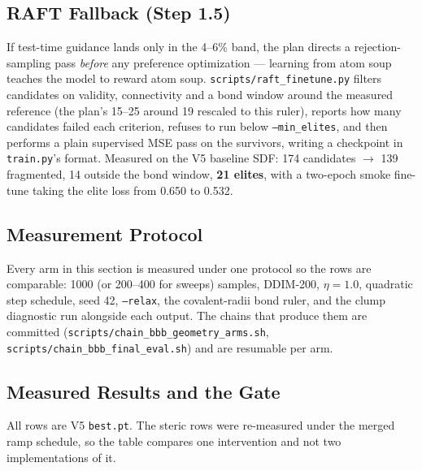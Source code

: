 \documentclass[12pt, a4paper]{article}
\begin{document}
\subsection{RAFT Fallback (Step 1.5)}

If test-time guidance lands only in the 4--6\% band, the plan directs a
rejection-sampling pass \emph{before} any preference optimization --- learning
from atom soup teaches the model to reward atom soup.
\texttt{scripts/raft\_finetune.py} filters candidates on validity,
connectivity and a bond window around the measured reference (the plan's
15--25 around 19 rescaled to this ruler), reports how many candidates failed
each criterion, refuses to run below \texttt{--min\_elites}, and then performs
a plain supervised MSE pass on the survivors, writing a checkpoint in
\texttt{train.py}'s format. Measured on the V5 baseline SDF: 174 candidates
$\rightarrow$ 139 fragmented, 14 outside the bond window, \textbf{21 elites},
with a two-epoch smoke fine-tune taking the elite loss from 0.650 to 0.532.

\subsection{Measurement Protocol}

Every arm in this section is measured under one protocol so the rows are
comparable: 1000 (or 200--400 for sweeps) samples, DDIM-200, $\eta = 1.0$,
quadratic step schedule, seed 42, \texttt{--relax}, the covalent-radii bond
ruler, and the clump diagnostic run alongside each output. The chains that
produce them are committed (\texttt{scripts/chain\_bbb\_geometry\_arms.sh},
\texttt{scripts/chain\_bbb\_final\_eval.sh}) and are resumable per arm.

\subsection{Measured Results and the Gate}

All rows are V5 \texttt{best.pt}. The steric rows were re-measured under the
merged ramp schedule, so the table compares one intervention and not two
implementations of it.
\end{document}
